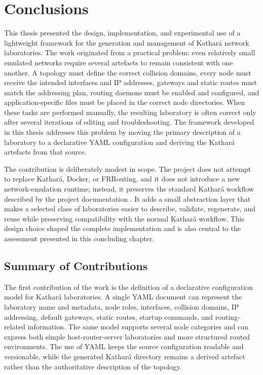 \chapter{Conclusions}
\label{chap:conclusions}

This thesis presented the design, implementation, and experimental use of a
lightweight framework for the generation and management of Kathar\'a network
laboratories. The work originated from a practical problem: even relatively
small emulated networks require several artefacts to remain consistent with one
another. A topology must define the correct collision domains, every node must
receive the intended interfaces and IP addresses, gateways and static routes
must match the addressing plan, routing daemons must be enabled and configured,
and application-specific files must be placed in the correct node directories.
When these tasks are performed manually, the resulting laboratory is often
correct only after several iterations of editing and troubleshooting. The
framework developed in this thesis addresses this problem by moving the primary
description of a laboratory to a declarative YAML configuration and deriving the
Kathar\'a artefacts from that source.

The contribution is deliberately modest in scope. The project does not attempt
to replace Kathar\'a, Docker, or FRRouting, and it does not introduce a new
network-emulation runtime; instead, it preserves the standard Kathar\'a
workflow described by the project documentation
\cite{kathara_website,kathara_manpage}. It adds a small abstraction layer that
makes a selected class of laboratories easier to describe, validate, regenerate,
and reuse while preserving compatibility with the normal Kathar\'a workflow.
This design choice shaped the complete implementation and is also central to the
assessment presented in this concluding chapter.

\section{Summary of Contributions}
\label{sec:conclusion-contributions}

The first contribution of the work is the definition of a declarative
configuration model for Kathar\'a laboratories. A single YAML document can
represent the laboratory name and metadata, node roles, interfaces, collision
domains, IP addressing, default gateways, static routes, startup commands, and
routing-related information. The same model supports several node categories
and can express both simple host-router-server laboratories and more structured
routed environments. The use of YAML keeps the source configuration readable
and versionable, while the generated Kathar\'a directory remains a derived
artefact rather than the authoritative description of the topology.

